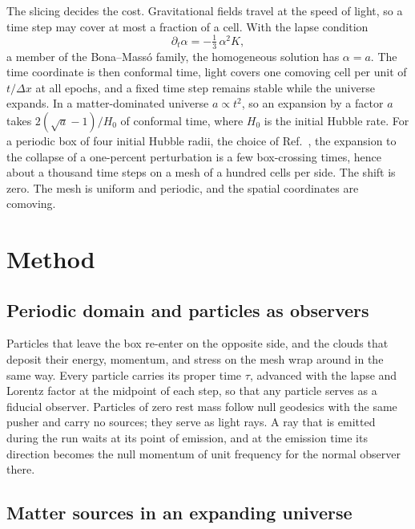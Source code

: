 \documentclass[aps,prd,twocolumn,10pt,superscriptaddress,nofootinbib,longbibliography,floatfix]{revtex4-2}
\begin{document}
The slicing decides the cost. Gravitational fields travel at the speed of light, so a time step may cover at most a fraction of a cell. With the lapse condition
\begin{equation}\label{eq:lapse}
\partial_t \alpha = -\tfrac{1}{3}\,\alpha^2 K ,
\end{equation}
a member of the Bona--Mass\'o family, the homogeneous solution has $\alpha = a$. The time coordinate is then conformal time, light covers one comoving cell per unit of $t/\Delta x$ at all epochs, and a fixed time step remains stable while the universe expands. In a matter-dominated universe $a \propto t^2$, so an expansion by a factor $a$ takes $2(\sqrt{a}-1)/H_0$ of conformal time, where $H_0$ is the initial Hubble rate. For a periodic box of four initial Hubble radii, the choice of Ref.~\cite{East:2019chx}, the expansion to the collapse of a one-percent perturbation is a few box-crossing times, hence about a thousand time steps on a mesh of a hundred cells per side. The shift is zero. The mesh is uniform and periodic, and the spatial coordinates are comoving.

\section{Method}\label{sec:method}

\subsection{Periodic domain and particles as observers}

Particles that leave the box re-enter on the opposite side, and the clouds that deposit their energy, momentum, and stress on the mesh wrap around in the same way. Every particle carries its proper time $\tau$, advanced with the lapse and Lorentz factor at the midpoint of each step, so that any particle serves as a fiducial observer. Particles of zero rest mass follow null geodesics with the same pusher and carry no sources; they serve as light rays. A ray that is emitted during the run waits at its point of emission, and at the emission time its direction becomes the null momentum of unit frequency for the normal observer there.

\subsection{Matter sources in an expanding universe}\label{sec:sources}
\end{document}
